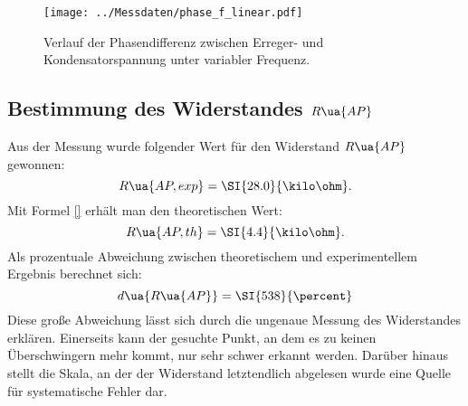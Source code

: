 \begin{figure}
  \centering
  \texttt{[image: ../Messdaten/phase\_f\_linear.pdf]}
  \caption{Verlauf der Phasendifferenz zwischen Erreger- und Kondensatorspannung unter variabler Frequenz.}
  \label{fig: phasenverlauf}
\end{figure}


\subsection{Bestimmung des Widerstandes $R\ua{AP}$}
Aus der Messung wurde folgender Wert für den Widerstand $R\ua{AP}$ gewonnen:
\begin{equation}
  R\ua{AP, exp} = \SI{28.0}{\kilo\ohm}.
\end{equation}
Mit Formel \eqref{} erhält man den theoretischen Wert:
\begin{equation}
    R\ua{AP, th} = \SI{4.4}{\kilo\ohm}.
\end{equation}
Als prozentuale Abweichung zwischen theoretischem und experimentellem Ergebnis berechnet sich:
\begin{equation}
  d\ua{R\ua{AP}} = \SI{538}{\percent}
\end{equation}
Diese große Abweichung lässt sich durch die ungenaue Messung des Widerstandes erklären. Einerseits kann der gesuchte Punkt,
an dem es zu keinen Überschwingern mehr kommt, nur sehr schwer erkannt werden. Darüber hinaus stellt die Skala, an der der Widerstand
letztendlich abgelesen wurde eine Quelle für systematische Fehler dar.
